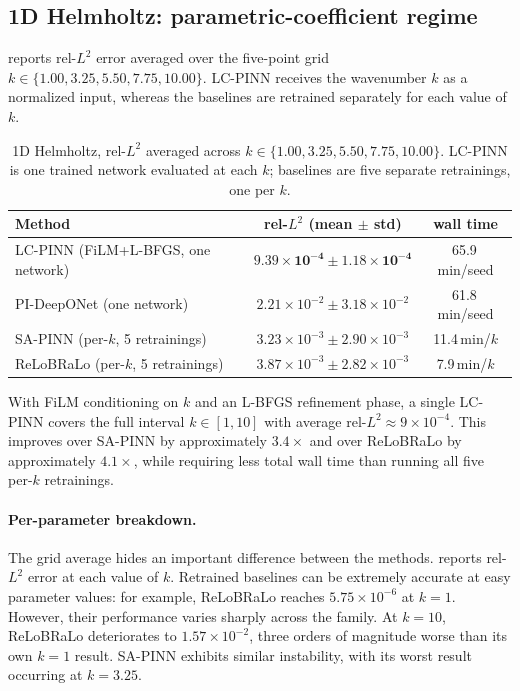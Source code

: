 \documentclass{article}
\theoremstyle{plain}
\theoremstyle{definition}
\theoremstyle{remark}
\begin{document}
\subsection{1D Helmholtz: parametric-coefficient regime}
\label{sec:results-helmholtz}

 reports rel-$L^2$ error averaged over the
five-point grid
$k \in \{1.00,3.25,5.50,7.75,10.00\}$. LC-PINN receives the
wavenumber $k$ as a normalized input, whereas the baselines are
retrained separately for each value of $k$.

\begin{table}[!t]
\centering
\caption{1D Helmholtz, rel-$L^2$ averaged across
$k \in \{1.00, 3.25, 5.50, 7.75, 10.00\}$. LC-PINN is one trained
network evaluated at each $k$; baselines are five separate
retrainings, one per $k$.}
\label{tab:helmholtz}
\small
\begin{tabular}{lcc}
\toprule
Method & rel-$L^2$ (mean $\pm$ std) & wall time \\
\midrule
LC-PINN (FiLM+L-BFGS, one network) & $\mathbf{9.39 \times 10^{-4} \pm 1.18 \times 10^{-4}}$ & 65.9\,min/seed \\
PI-DeepONet (one network)          & $2.21 \times 10^{-2} \pm 3.18 \times 10^{-2}$ & 61.8\,min/seed \\
SA-PINN (per-$k$, 5 retrainings)   & $3.23 \times 10^{-3} \pm 2.90 \times 10^{-3}$ & 11.4\,min/$k$ \\
ReLoBRaLo (per-$k$, 5 retrainings) & $3.87 \times 10^{-3} \pm 2.82 \times 10^{-3}$ & 7.9\,min/$k$ \\
\bottomrule
\end{tabular}
\end{table}

With FiLM conditioning on $k$ and an L-BFGS refinement phase, a single
LC-PINN covers the full interval $k \in [1,10]$ with average
rel-$L^2 \approx 9 \times 10^{-4}$. This improves over SA-PINN by
approximately $3.4\times$ and over ReLoBRaLo by approximately
$4.1\times$, while requiring less total wall time than running all
five per-$k$ retrainings.

\paragraph{Per-parameter breakdown.}
The grid average hides an important difference between the methods.
 reports rel-$L^2$ error at each value of $k$.
Retrained baselines can be extremely accurate at easy parameter values:
for example, ReLoBRaLo reaches $5.75 \times 10^{-6}$ at $k=1$.
However, their performance varies sharply across the family. At
$k=10$, ReLoBRaLo deteriorates to $1.57 \times 10^{-2}$, three orders
of magnitude worse than its own $k=1$ result. SA-PINN exhibits similar
instability, with its worst result occurring at $k=3.25$.
\end{document}
